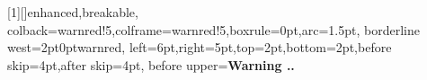 
\usepackage[a4paper,margin=1.9cm]{geometry}
\usepackage{lmodern}
\usepackage[T1]{fontenc}
\usepackage{xcolor}
\usepackage[most]{tcolorbox}
\usepackage{etoolbox}
\usepackage{titlesec}
\titlespacing*{\section}{0pt}{1.0em}{0.35em}

\theoremstyle{compactit}
\newtheorem{thm}{Theorem}[section]
\newtheorem{prop}[thm]{Proposition}
\theoremstyle{compactup}
\newtheorem{defn}[thm]{Definition}
\newtheorem{example}[thm]{Example}
\newtheorem{remark}[thm]{Remark}

[1][]{enhanced,breakable,
  colback=warnred!5,colframe=warnred!5,boxrule=0pt,arc=1.5pt,
  borderline west={2pt}{0pt}{warnred},
  left=6pt,right=5pt,top=2pt,bottom=2pt,before skip=4pt,after skip=4pt,
  before upper={\textbf{\color{warnred}Warning \thesection.}\textbf{.}\ }}
\renewcommand{\thethm}{\thesection.\arabic{thm}}

\newcommand{\WalkthroughHeader}[5]{%
  \noindent{\Large\bfseries #3}\par\smallskip
  \noindent #1 \;\textperiodcentered\; #2 \;\textperiodcentered\; #4\par
  \noindent{\small Sources: #5}\par
  \medskip\hrule\medskip}
